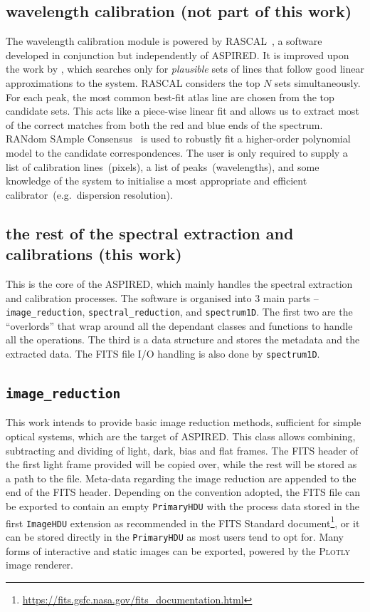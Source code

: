 \documentclass[fleqn,usenatbib]{mnras}
\begin{document}
\subsection*{wavelength calibration (not part of this work)}
The wavelength calibration module is powered by
\textsc{RASCAL}~\citep{2020zndo...4117517V, 2020ASPC..527..627V}, a software
developed in conjunction but independently of \textsc{ASPIRED}. It is improved
upon the work by \citet{2018ApOpt..57.6876S}, which searches only for
\textit{plausible} sets of lines that follow good linear approximations to the
system. \textsc{RASCAL} considers the top $N$ sets simultaneously. For each
peak, the most common best-fit atlas line are chosen from the top candidate
sets. This acts like a piece-wise linear fit and allows us to extract most of
the correct matches from both the red and blue ends of the spectrum. RANdom
SAmple Consensus~\citep[RANSAC,][]{fischler_bolles_1981} is used to robustly
fit a higher-order polynomial model to the candidate correspondences. The user is only required to supply a list of calibration lines~(pixels), a
list of peaks~(wavelengths), and some knowledge of the system to initialise a
most appropriate and efficient calibrator~(e.g.\ dispersion resolution).

\subsection*{the rest of the spectral extraction and calibrations (this work)}
This is the core of the \textsc{ASPIRED}, which mainly handles the spectral
extraction and calibration processes. The software is organised into
3 main parts -- \texttt{image\_reduction}, \texttt{spectral\_reduction},
and \texttt{spectrum1D}. The first two are the ``overlords'' that wrap
around all the dependant classes and functions to handle all the operations.
The third is a data structure and stores the metadata and the extracted
data. The FITS file I/O handling is also done by \texttt{spectrum1D}.

\subsection*{\texttt{image\_reduction}}
This work intends to 
provide basic image reduction methods, sufficient
for simple optical systems, which are the target of \textsc{ASPIRED}.
This class allows combining, subtracting and dividing of light, dark, bias
and flat frames. The FITS header of the first light frame provided will be
copied over, while the rest will be stored as a path to the file. Meta-data
regarding the image reduction are appended to the end of the FITS header.
Depending on the convention adopted, the FITS file can be exported to contain
an empty \texttt{PrimaryHDU} with the process data stored in the first
\texttt{ImageHDU} extension as recommended in the FITS Standard
document\footnote{\url{https://fits.gsfc.nasa.gov/fits_documentation.html}},
or it can be stored directly in the \texttt{PrimaryHDU} as most users tend
to opt for. Many forms of interactive and static images can be exported,
powered by the \textsc{Plotly} image renderer.
\end{document}
